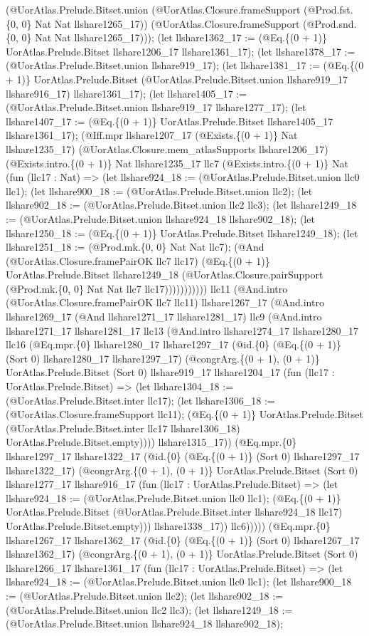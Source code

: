 \documentclass[11pt]{article}
\begin{document}
(@UorAtlas.Prelude.Bitset.union (@UorAtlas.Closure.frameSupport (@Prod.fst.\{0, 0\} Nat Nat llshare1265\_17)) (@UorAtlas.Closure.frameSupport (@Prod.snd.\{0, 0\} Nat Nat llshare1265\_17))); (let llshare1362\_17 := (@Eq.\{(0 + 1)\} UorAtlas.Prelude.Bitset llshare1206\_17 llshare1361\_17); (let llshare1378\_17 := (@UorAtlas.Prelude.Bitset.union llshare919\_17); (let llshare1381\_17 := (@Eq.\{(0 + 1)\} UorAtlas.Prelude.Bitset (@UorAtlas.Prelude.Bitset.union llshare919\_17 llshare916\_17) llshare1361\_17); (let llshare1405\_17 := (@UorAtlas.Prelude.Bitset.union llshare919\_17 llshare1277\_17); (let llshare1407\_17 := (@Eq.\{(0 + 1)\} UorAtlas.Prelude.Bitset llshare1405\_17 llshare1361\_17); (@Iff.mpr llshare1207\_17 (@Exists.\{(0 + 1)\} Nat llshare1235\_17) (@UorAtlas.Closure.mem\_atlasSupports llshare1206\_17) (@Exists.intro.\{(0 + 1)\} Nat llshare1235\_17 llc7 (@Exists.intro.\{(0 + 1)\} Nat (fun (llc17 : Nat) => (let llshare924\_18 := (@UorAtlas.Prelude.Bitset.union llc0 llc1); (let llshare900\_18 := (@UorAtlas.Prelude.Bitset.union llc2); (let llshare902\_18 := (@UorAtlas.Prelude.Bitset.union llc2 llc3); (let llshare1249\_18 := (@UorAtlas.Prelude.Bitset.union llshare924\_18 llshare902\_18); (let llshare1250\_18 := (@Eq.\{(0 + 1)\} UorAtlas.Prelude.Bitset llshare1249\_18); (let llshare1251\_18 := (@Prod.mk.\{0, 0\} Nat Nat llc7); (@And (@UorAtlas.Closure.framePairOK llc7 llc17) (@Eq.\{(0 + 1)\} UorAtlas.Prelude.Bitset llshare1249\_18 (@UorAtlas.Closure.pairSupport (@Prod.mk.\{0, 0\} Nat Nat llc7 llc17))))))))))) llc11 (@And.intro (@UorAtlas.Closure.framePairOK llc7 llc11) llshare1267\_17 (@And.intro llshare1269\_17 (@And llshare1271\_17 llshare1281\_17) llc9 (@And.intro llshare1271\_17 llshare1281\_17 llc13 (@And.intro llshare1274\_17 llshare1280\_17 llc16 (@Eq.mpr.\{0\} llshare1280\_17 llshare1297\_17 (@id.\{0\} (@Eq.\{(0 + 1)\} (Sort 0) llshare1280\_17 llshare1297\_17) (@congrArg.\{(0 + 1), (0 + 1)\} UorAtlas.Prelude.Bitset (Sort 0) llshare919\_17 llshare1204\_17 (fun (llc17 : UorAtlas.Prelude.Bitset) => (let llshare1304\_18 := (@UorAtlas.Prelude.Bitset.inter llc17); (let llshare1306\_18 := (@UorAtlas.Closure.frameSupport llc11); (@Eq.\{(0 + 1)\} UorAtlas.Prelude.Bitset (@UorAtlas.Prelude.Bitset.inter llc17 llshare1306\_18) UorAtlas.Prelude.Bitset.empty)))) llshare1315\_17)) (@Eq.mpr.\{0\} llshare1297\_17 llshare1322\_17 (@id.\{0\} (@Eq.\{(0 + 1)\} (Sort 0) llshare1297\_17 llshare1322\_17) (@congrArg.\{(0 + 1), (0 + 1)\} UorAtlas.Prelude.Bitset (Sort 0) llshare1277\_17 llshare916\_17 (fun (llc17 : UorAtlas.Prelude.Bitset) => (let llshare924\_18 := (@UorAtlas.Prelude.Bitset.union llc0 llc1); (@Eq.\{(0 + 1)\} UorAtlas.Prelude.Bitset (@UorAtlas.Prelude.Bitset.inter llshare924\_18 llc17) UorAtlas.Prelude.Bitset.empty))) llshare1338\_17)) llc6))))) (@Eq.mpr.\{0\} llshare1267\_17 llshare1362\_17 (@id.\{0\} (@Eq.\{(0 + 1)\} (Sort 0) llshare1267\_17 llshare1362\_17) (@congrArg.\{(0 + 1), (0 + 1)\} UorAtlas.Prelude.Bitset (Sort 0) llshare1266\_17 llshare1361\_17 (fun (llc17 : UorAtlas.Prelude.Bitset) => (let llshare924\_18 := (@UorAtlas.Prelude.Bitset.union llc0 llc1); (let llshare900\_18 := (@UorAtlas.Prelude.Bitset.union llc2); (let llshare902\_18 := (@UorAtlas.Prelude.Bitset.union llc2 llc3); (let llshare1249\_18 := (@UorAtlas.Prelude.Bitset.union llshare924\_18 llshare902\_18); 
\end{document}
